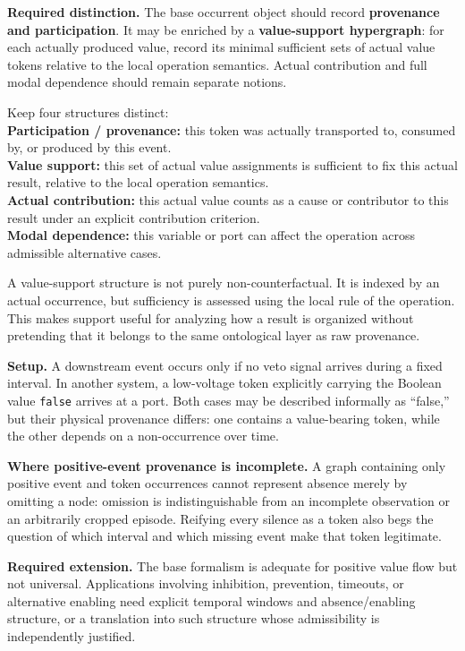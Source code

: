 \documentclass[11pt,a4paper]{article}
\newcounter{thought}
\newenvironment{thoughtbox}[1]{%
  \refstepcounter{thought}%
  \begin{tcolorbox}[
    enhanced,breakable,
    colback=white,colframe=navy,boxrule=0.85pt,
    arc=1.7mm,left=2.8mm,right=2.8mm,top=2.2mm,bottom=2.0mm,
    borderline west={2.2pt}{0pt}{blue},
    title={\large\bfseries Thought experiment \thethought: #1},
    fonttitle=\bfseries,coltitle=navy,
    attach boxed title to top left={xshift=2mm,yshift=-2mm},
    boxed title style={colback=sky,colframe=blue,boxrule=0.55pt,arc=1.2mm},
    before skip=9pt,after skip=10pt
  ]
}{\end{tcolorbox}}
\newcommand{\scene}{\medskip\textbf{Setup.} }
\begin{document}
\begin{thoughtbox}{Participation, contribution, and value support}
\medskip\textbf{Required distinction.} The base occurrent object should record \textbf{provenance and participation}. It may be enriched by a \textbf{value-support hypergraph}: for each actually produced value, record its minimal sufficient sets of actual value tokens relative to the local operation semantics. Actual contribution and full modal dependence should remain separate notions.

\begin{conceptbox}
Keep four structures distinct:\\[1mm]
\textbf{Participation / provenance:} this token was actually transported to, consumed by, or produced by this event.\\
\textbf{Value support:} this set of actual value assignments is sufficient to fix this actual result, relative to the local operation semantics.\\
\textbf{Actual contribution:} this actual value counts as a cause or contributor to this result under an explicit contribution criterion.\\
\textbf{Modal dependence:} this variable or port can affect the operation across admissible alternative cases.
\end{conceptbox}

\begin{cautionbox}
A value-support structure is not purely non-counterfactual. It is indexed by an actual occurrence, but sufficiency is assessed using the local rule of the operation. This makes support useful for analyzing how a result is organized without pretending that it belongs to the same ontological layer as raw provenance.
\end{cautionbox}
\end{thoughtbox}

\begin{thoughtbox}{A result produced by silence or inhibition}
\scene A downstream event occurs only if no veto signal arrives during a fixed interval. In another system, a low-voltage token explicitly carrying the Boolean value \texttt{false} arrives at a port. Both cases may be described informally as ``false,'' but their physical provenance differs: one contains a value-bearing token, while the other depends on a non-occurrence over time.

\medskip\textbf{Where positive-event provenance is incomplete.} A graph containing only positive event and token occurrences cannot represent absence merely by omitting a node: omission is indistinguishable from an incomplete observation or an arbitrarily cropped episode. Reifying every silence as a token also begs the question of which interval and which missing event make that token legitimate.

\medskip\textbf{Required extension.} The base formalism is adequate for positive value flow but not universal. Applications involving inhibition, prevention, timeouts, or alternative enabling need explicit temporal windows and absence/enabling structure, or a translation into such structure whose admissibility is independently justified.
\end{thoughtbox}
\end{document}
